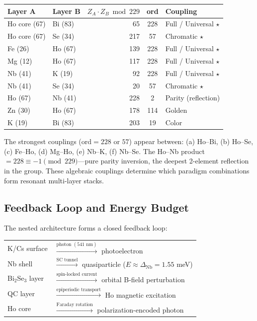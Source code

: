 \begin{center}
\begin{tabular}{@{}llrcl@{}}
\toprule
\textbf{Layer A} & \textbf{Layer B} & $Z_A \cdot Z_B \bmod 229$ & \textbf{ord} & \textbf{Coupling} \\
\midrule
Ho core (67) & Bi (83) & 65 & 228 & Full / Universal $\star$ \\
Ho core (67) & Se (34) & 217 & 57 & Chromatic $\star$ \\
Fe (26) & Ho (67) & 139 & 228 & Full / Universal $\star$ \\
Mg (12) & Ho (67) & 117 & 228 & Full / Universal $\star$ \\
Nb (41) & K (19) & 92 & 228 & Full / Universal $\star$ \\
Nb (41) & Se (34) & 20 & 57 & Chromatic $\star$ \\
Ho (67) & Nb (41) & 228 & 2 & Parity (reflection) \\
Zn (30) & Ho (67) & 178 & 114 & Golden \\
K (19) & Bi (83) & 203 & 19 & Color \\
\bottomrule
\end{tabular}
\end{center}

\noindent The strongest couplings ($\mathrm{ord} = 228$ or $57$) appear between: (a) Ho--Bi, (b) Ho--Se, (c) Fe--Ho, (d) Mg--Ho, (e) Nb--K, (f) Nb--Se. The Ho--Nb product $= 228 \equiv -1 \pmod{229}$---pure parity inversion, the deepest 2-element reflection in the group. These algebraic couplings determine which paradigm combinations form resonant multi-layer stacks.

\subsection{Feedback Loop and Energy Budget}

The nested architecture forms a closed feedback loop:

\begin{center}
\begin{tabular}{@{}ll@{}}
K/Cs surface & $\xrightarrow{\text{photon } (541\text{ nm})}$ photoelectron \\
Nb shell & $\xrightarrow{\text{SC tunnel}}$ quasiparticle ($E \approx \Delta_{\text{Nb}} = 1.55$ meV) \\
Bi$_2$Se$_3$ layer & $\xrightarrow{\text{spin-locked current}}$ orbital B-field perturbation \\
QC layer & $\xrightarrow{\text{epiperiodic transport}}$ Ho magnetic excitation \\
Ho core & $\xrightarrow{\text{Faraday rotation}}$ polarization-encoded photon \\
\end{tabular}
\end{center}

